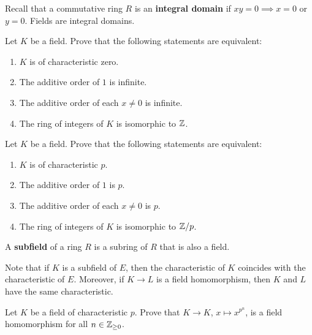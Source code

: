 Recall that a commutative ring $R$ is an \textbf{integral 
domain} if $xy=0\implies x=0$ or $y=0$. Fields
are integral domains. 

\begin{exercise}
	Let $K$ be a field. Prove that
	the following statements are equivalent:
	\begin{enumerate}
		\item $K$ is of characteristic zero.
		\item The additive order of $1$ is infinite. 
		\item The additive order of each $x\ne0$ is infinite.
		\item The ring of integers of $K$ is isomorphic to $\mathbb{Z}$.
	\end{enumerate}
\end{exercise}

\begin{exercise}
	Let $K$ be a field. Prove that
	the following statements are equivalent:
	\begin{enumerate}
		\item $K$ is of characteristic $p$.
		\item The additive order of $1$ is $p$. 
		\item The additive order of each $x\ne0$ is $p$.
		\item The ring of integers of $K$ is isomorphic to $\mathbb{Z}/p$.
	\end{enumerate}
\end{exercise}



\begin{definition}
	A \textbf{subfield} of a ring $R$ is a subring of $R$ 
	that is also a field.
\end{definition}

Note that if $K$ is a subfield of $E$, then
the characteristic of $K$ coincides
with the characteristic 
of $E$. Moreover, if $K\to L$ is a field homomorphism, then
$K$ and $L$ have the same characteristic. 

\begin{exercise}
	Let $K$ be a field of characteristic $p$. Prove
	that $K\to K$, $x\mapsto x^{p^n}$, is a field homomorphism
	for all $n\in\mathbb{Z}_{\geq 0}$. 
\end{exercise}

